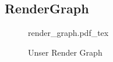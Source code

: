 \subsection{RenderGraph}

\begin{figure}[H]
    \centering
    \def\svgwidth{\columnwidth}
    {render_graph.pdf_tex}
    \caption{Unser Render Graph}
    \label{pic::RenderGraph}
\end{figure}





